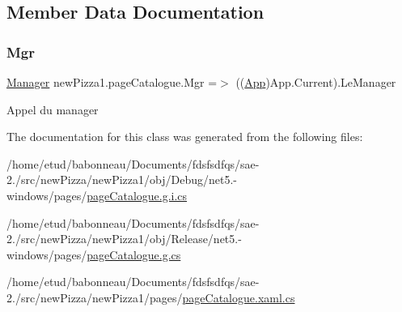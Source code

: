 \subsection{Member Data Documentation}
\mbox{\label{classnewPizza1_1_1pageCatalogue_a95c606a1eec692ffe15917488596366c}} 
\subsubsection{\texorpdfstring{Mgr}{Mgr}}
{\footnotesize\ttfamily \hyperlink{classModele_1_1Manager}{Manager} new\+Pizza1.\+page\+Catalogue.\+Mgr =$>$ ((\hyperlink{classnewPizza1_1_1App}{App})App.\+Current).Le\+Manager}



Appel du manager 



The documentation for this class was generated from the following files\+:\begin{DoxyCompactItemize}
\item 
/home/etud/babonneau/\+Documents/fdsfsdfqs/sae-\/2./src/new\+Pizza/new\+Pizza1/obj/\+Debug/net5.-\/windows/pages/\hyperlink{net5_80-windows_2pages_2pageCatalogue_8g_8i_8cs}{page\+Catalogue.\+g.\+i.\+cs}\item 
/home/etud/babonneau/\+Documents/fdsfsdfqs/sae-\/2./src/new\+Pizza/new\+Pizza1/obj/\+Release/net5.-\/windows/pages/\hyperlink{pageCatalogue_8g_8cs}{page\+Catalogue.\+g.\+cs}\item 
/home/etud/babonneau/\+Documents/fdsfsdfqs/sae-\/2./src/new\+Pizza/new\+Pizza1/pages/\hyperlink{pageCatalogue_8xaml_8cs}{page\+Catalogue.\+xaml.\+cs}\end{DoxyCompactItemize}
